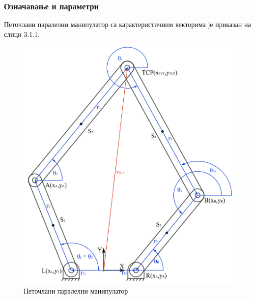 \documentclass[12pt]{article}
\begin{document}
\subsubsection{Означавање и параметри}
Петочлани паралелни манипулатор са карактеристичним векторима је приказан на слици 3.1.1.
\begin{figure}[H]
    \centering
    \includegraphics[width=12cm]{figures/5bar.jpg}
    \caption{Петочлани паралелни манипулатор}
    \label{fig:5bar_manipulator}
\end{figure}
\end{document}
